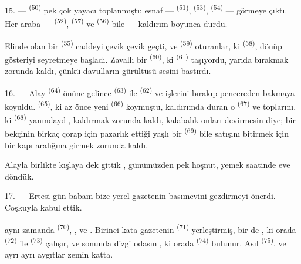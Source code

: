 15. ---  \textsuperscript{(50)} pek çok yayacı
toplanmıştı; esnaf ---  \textsuperscript{(51)},
 \textsuperscript{(53)}, 
\textsuperscript{(54)} ---  görmeye çıktı. Her araba ---
 \textsuperscript{(52)}, 
\textsuperscript{(57)} ve  \textsuperscript{(56)} bile ---
kaldırım boyunca durdu.

\VUsaut{3.0mm}

Elinde  olan bir 
\textsuperscript{(55)} caddeyi çevik çevik geçti, ve  \textsuperscript{(59)}
oturanlar, ki  \textsuperscript{(58)}, dönüp gösteriyi
seyretmeye başladı. Zavallı bir 
\textsuperscript{(60)}, ki  \textsuperscript{(61)}
taşıyordu,  yarıda bırakmak zorunda kaldı, çünkü
davulların gürültüsü sesini bastırdı.

16. --- Alay  \textsuperscript{(64)} önüne gelince
 \textsuperscript{(63)} ile 
\textsuperscript{(62)}  ve işlerini bırakıp
pencereden bakmaya koyuldu.  \textsuperscript{(65)}, ki az
önce  yeni  \textsuperscript{(66)}
koymuştu, kaldırımda duran o  \textsuperscript{(67)} ve
 toplarını, ki  \textsuperscript{(68)}
yanındaydı, kaldırmak zorunda kaldı, kalabalık onları devirmesin diye; bir bekçinin birkaç
çorap için pazarlık ettiği yaşlı bir 
\textsuperscript{(69)} bile satışını bitirmek için bir kapı aralığına girmek
zorunda kaldı.

Alayla birlikte kışlaya dek gittik , günümüzden pek hoşnut, yemek
saatinde eve döndük.

\VUsaut{3.0mm}

17. --- Ertesi gün babam bize yerel gazetenin basımevini gezdirmeyi önerdi.
Coşkuyla kabul ettik.

 aynı zamanda  \textsuperscript{(70)},
,  ve . Birinci kata
gazetenin  \textsuperscript{(71)} yerleştirmiş,
bir de , ki orada 
\textsuperscript{(72)} ile  \textsuperscript{(73)}
çalışır, ve sonunda dizgi odasını, ki orada 
\textsuperscript{(74)} bulunur. Asıl  \textsuperscript{(75)},
 ve ayrı ayrı aygıtlar zemin katta.

